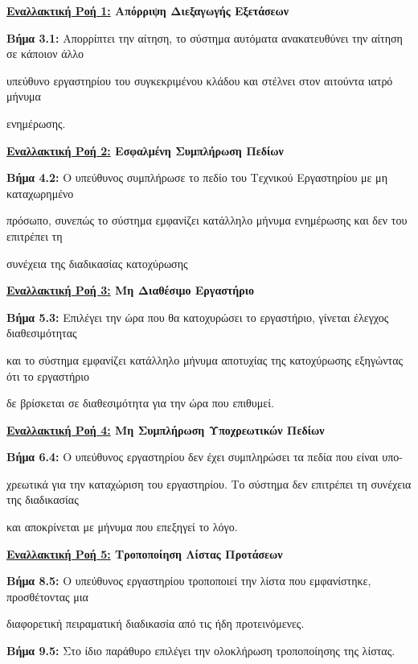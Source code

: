 \documentclass{article}
\begin{document}
  \textbf{\underline{Εναλλακτική Ροή 1:} Απόρριψη Διεξαγωγής Εξετάσεων} \vspace{0.2cm}
\par \textbf{Βήμα 3.1:} Απορρίπτει την αίτηση, το σύστημα αυτόματα ανακατευθύνει την αίτηση σε κάποιον άλλο \par υπεύθυνο εργαστηρίου του συγκεκριμένου κλάδου και στέλνει στον αιτούντα ιατρό μήνυμα \par ενημέρωσης. \vspace{0.2cm}

\textbf{\underline{Εναλλακτική Ροή 2:} Εσφαλμένη Συμπλήρωση Πεδίων} \vspace{0.2cm}
\par \textbf{Βήμα 4.2:} Ο υπεύθυνος συμπλήρωσε το πεδίο του Τεχνικού Εργαστηρίου με μη καταχωρημένο \par πρόσωπο, συνεπώς το σύστημα εμφανίζει κατάλληλο μήνυμα ενημέρωσης και δεν του επιτρέπει τη \par συνέχεια της διαδικασίας κατοχύρωσης \vspace{0.2cm}

\textbf{\underline{Εναλλακτική Ροή 3:} Μη Διαθέσιμο Εργαστήριο} \vspace{0.2cm}
\par \textbf{Βήμα 5.3:} Επιλέγει την ώρα που θα κατοχυρώσει το εργαστήριο, γίνεται έλεγχος διαθεσιμότητας \par και το σύστημα εμφανίζει κατάλληλο μήνυμα αποτυχίας της κατοχύρωσης εξηγώντας ότι το εργαστήριο \par δε βρίσκεται σε διαθεσιμότητα για την ώρα που επιθυμεί. \vspace{0.2cm}

\textbf{\underline{Εναλλακτική Ροή 4:} Μη Συμπλήρωση Υποχρεωτικών Πεδίων} \vspace{0.2cm}
\par \textbf{Βήμα 6.4:} Ο υπεύθυνος εργαστηρίου δεν έχει συμπληρώσει τα πεδία που είναι υπο- \par χρεωτικά για την καταχώριση του εργαστηρίου. Το σύστημα δεν επιτρέπει τη συνέχεια της διαδικασίας \par και αποκρίνεται με μήνυμα που επεξηγεί το λόγο.  \vspace{0.2cm}

\textbf{\underline{Εναλλακτική Ροή 5:} Τροποποίηση Λίστας Προτάσεων} \vspace{0.2cm}
\par \textbf{Βήμα 8.5:} Ο υπεύθυνος εργαστηρίου τροποποιεί την λίστα που εμφανίστηκε, προσθέτοντας μια \par διαφορετική πειραματική διαδικασία από τις ήδη προτεινόμενες. \vspace{0.1cm}
\par \textbf{Βήμα 9.5:} Στο ίδιο παράθυρο επιλέγει την ολοκλήρωση τροποποίησης της λίστας. \vspace{0.1cm}
\end{document}
